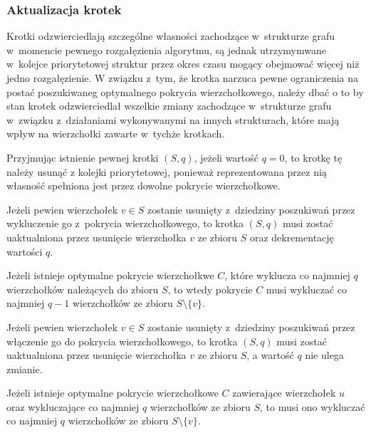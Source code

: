 \subsubsection{\textbf{Aktualizacja krotek}}
\label{sss_ckx_updating_tuples}
\par{
  Krotki odzwierciedlają szczególne własności zachodzące w~strukturze grafu w~momencie pewnego rozgałęzienia algorytmu, są jednak utrzymymwane w~kolejce priorytetowej struktur przez okres czasu mogący obejmować więcej niż jedno rozgałęzienie.
  W związku z~tym, że krotka narzuca pewne ograniczenia na postać poszukiwaneg optymalnego pokrycia wierzchołkowego, należy dbać o to by stan krotek odzwierciedlał wszelkie zmiany zachodzące w~strukturze grafu w~związku z~działaniami wykonywanymi na innych strukturach, które mają wpływ na wierzchołki zawarte w~tychże krotkach.
}
\par{
  Przyjmując istnienie pewnej krotki $(S, q)$, jeżeli wartość $q = 0$, to krotkę tę należy usunąć z kolejki priorytetowej, ponieważ reprezentowana przez nią własność spełniona jest przez dowolne pokrycie wierzchołkowe.
  \begin{theorem}
    Jeżeli pewien wierzchołek $v \in S$ zostanie usunięty z~dziedziny poszukiwań przez wykluczenie go z~pokrycia wierzchołkowego, to krotka $(S, q)$ musi zostać uaktualniona przez usunięcie wierzchołka $v$ ze zbioru $S$ oraz dekrementację wartości $q$.
  \end{theorem}
  \begin{bproof}
    Jeżeli istnieje optymalne pokrycie wierzchołkwe $C$, które wyklucza co najmniej $q$ wierzchołków należących do zbioru $S$, to wtedy pokrycie $C$ musi wykluczać co najmniej $q-1$ wierzchołków ze zbioru $S \setminus \{v\}$.
  \end{bproof}
  \begin{theorem}
    Jeżeli pewien wierzchołek $v \in S$ zostanie usunięty z~dziedziny poszukiwań przez włączenie go do pokrycia wierzchołkowego, to krotka $(S, q)$ musi zostać uaktualniona przez usunięcie wierzchołka $v$ ze zbioru $S$, a wartość $q$ nie ulega zmianie.
  \end{theorem}
  \begin{bproof}
    Jeżeli istnieje optymalne pokrycie wierzchołkowe $C$ zawierające wierzchołek $u$ oraz wykluczające co najmniej $q$ wierzchołków ze zbioru $S$, to musi ono wykluczać co najmniej $q$ wierzchołków ze zbioru $S \setminus \{v\}$.
  \end{bproof}
}
